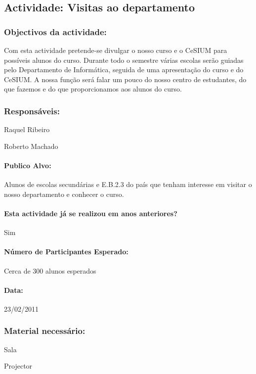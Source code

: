 \subsection{Actividade: Visitas ao departamento} %

\subsubsection*{Objectivos da actividade:}
Com esta actividade pretende-se divulgar o nosso curso e o CeSIUM para possíveis alunos do curso. Durante todo o semestre várias escolas serão guiadas pelo Departamento de Informática, seguida de uma apresentação do curso e do CeSIUM. A nossa função será falar um pouco do nosso centro de estudantes, do que fazemos e do que proporcionamos aos alunos do curso.

\subsubsection*{Responsáveis:}
\begin{itemizedash}
	\item{Raquel Ribeiro}
	\item{Roberto Machado}
\end{itemizedash}

\paragraph{Publico Alvo: }
Alunos de escolas secundárias e E.B.2.3 do país que tenham interesse  em visitar o nosso departamento e conhecer o curso.

\paragraph{Esta actividade já se realizou em anos anteriores?}
Sim

\paragraph{Número de Participantes Esperado:}
Cerca de 300 alunos esperados

\paragraph{Data:} 23/02/2011

\subsubsection*{Material necessário:}
\begin{itemizedash}
	\item{Sala}
	\item{Projector}
\end{itemizedash}

